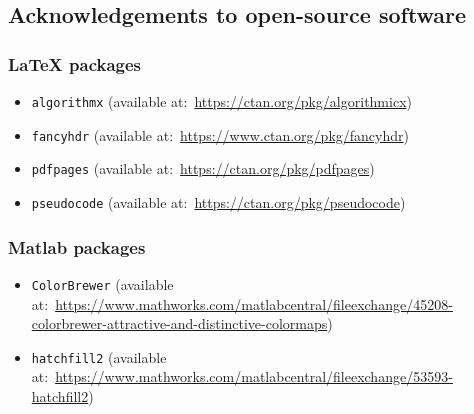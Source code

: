 
\cleardoublepage
{}
{}

\small



\newpage
\subsection*{Acknowledgements to open-source software}
\subsubsection*{LaTeX packages}
\begin{itemize}
	\item \texttt{algorithmx} (available at:~\url{https://ctan.org/pkg/algorithmicx})	%
	\item \texttt{fancyhdr} (available at:~\url{https://www.ctan.org/pkg/fancyhdr})
	\item \texttt{pdfpages} (available at:~\url{https://ctan.org/pkg/pdfpages})	%
	\item \texttt{pseudocode} (available at:~\url{https://ctan.org/pkg/pseudocode})
\end{itemize}

\subsubsection*{Matlab packages}
\begin{itemize}
	\item \texttt{ColorBrewer} 	(available at:~\url{https://www.mathworks.com/matlabcentral/fileexchange/45208-colorbrewer-attractive-and-distinctive-colormaps}) %
	\item \texttt{hatchfill2} (available at:~\url{https://www.mathworks.com/matlabcentral/fileexchange/53593-hatchfill2}) %
\end{itemize}